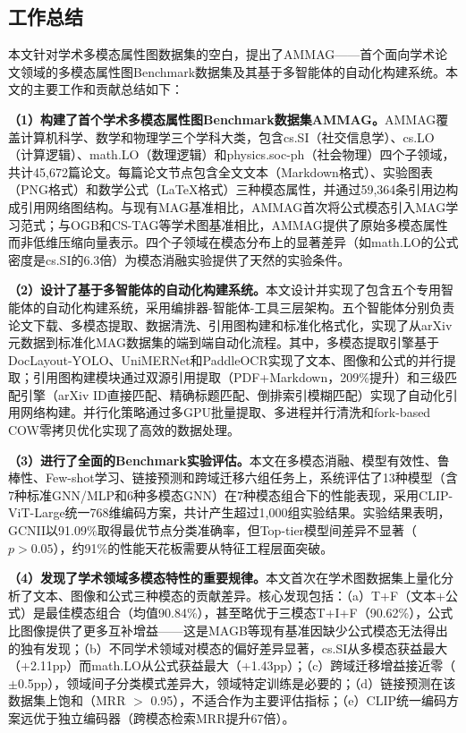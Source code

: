 
\begin{conclusion}

\section{工作总结}

本文针对学术多模态属性图数据集的空白，提出了AMMAG——首个面向学术论文领域的多模态属性图Benchmark数据集及其基于多智能体的自动化构建系统。本文的主要工作和贡献总结如下：

\textbf{（1）构建了首个学术多模态属性图Benchmark数据集AMMAG。}AMMAG覆盖计算机科学、数学和物理学三个学科大类，包含cs.SI（社交信息学）、cs.LO（计算逻辑）、math.LO（数理逻辑）和physics.soc-ph（社会物理）四个子领域，共计45,672篇论文。每篇论文节点包含全文文本（Markdown格式）、实验图表（PNG格式）和数学公式（LaTeX格式）三种模态属性，并通过59,364条引用边构成引用网络图结构。与现有MAG基准相比，AMMAG首次将公式模态引入MAG学习范式；与OGB\cite{hu2020ogb}和CS-TAG\cite{yan2023cstag}等学术图基准相比，AMMAG提供了原始多模态属性而非低维压缩向量表示。四个子领域在模态分布上的显著差异（如math.LO的公式密度是cs.SI的6.3倍）为模态消融实验提供了天然的实验条件。

\textbf{（2）设计了基于多智能体的自动化构建系统。}本文设计并实现了包含五个专用智能体的自动化构建系统，采用编排器-智能体-工具三层架构。五个智能体分别负责论文下载、多模态提取、数据清洗、引用图构建和标准化格式化，实现了从arXiv元数据到标准化MAG数据集的端到端自动化流程。其中，多模态提取引擎基于DocLayout-YOLO\cite{zhao2024doclayoutyolo}、UniMERNet\cite{wang2024unimernet}和PaddleOCR\cite{du2020ppocr}实现了文本、图像和公式的并行提取；引用图构建模块通过双源引用提取（PDF+Markdown，209\%提升）和三级匹配引擎（arXiv ID直接匹配、精确标题匹配、倒排索引模糊匹配）实现了自动化引用网络构建。并行化策略通过多GPU批量提取、多进程并行清洗和fork-based COW零拷贝优化实现了高效的数据处理。

\textbf{（3）进行了全面的Benchmark实验评估。}本文在多模态消融、模型有效性、鲁棒性、Few-shot学习、链接预测和跨域迁移六组任务上，系统评估了13种模型（含7种标准GNN/MLP和6种多模态GNN）在7种模态组合下的性能表现，采用CLIP-ViT-Large统一768维编码方案，共计产生超过1,000组实验结果。实验结果表明，GCNII以91.09\%取得最优节点分类准确率，但Top-tier模型间差异不显著（$p > 0.05$），约91\%的性能天花板需要从特征工程层面突破。

\textbf{（4）发现了学术领域多模态特性的重要规律。}本文首次在学术图数据集上量化分析了文本、图像和公式三种模态的贡献差异。核心发现包括：（a）T+F（文本+公式）是最佳模态组合（均值90.84\%），甚至略优于三模态T+I+F（90.62\%），公式比图像提供了更多互补增益——这是MAGB\cite{yan2025magb}等现有基准因缺少公式模态无法得出的独有发现；（b）不同学术领域对模态的偏好差异显著，cs.SI从多模态获益最大（+2.11pp）而math.LO从公式获益最大（+1.43pp）；（c）跨域迁移增益接近零（$\pm$0.5pp），领域间子分类模式差异大，领域特定训练是必要的；（d）链接预测在该数据集上饱和（MRR $>$ 0.95），不适合作为主要评估指标；（e）CLIP统一编码方案远优于独立编码器（跨模态检索MRR提升67倍）。


\end{conclusion}
